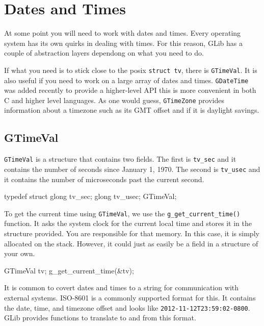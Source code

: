 \chapter{Dates and Times}

At some point you will need to work with dates and times.
Every operating system has its own quirks in dealing with times.
For this reason, GLib has a couple of abstraction layers dependong on what you need to do.

If what you need is to stick close to the posix \verb|struct tv|, there is \verb|GTimeVal|.
It is also useful if you need to work on a large array of dates and times.
\verb|GDateTime| was added recently to provide a higher-level API this is more convenient in both C and higher level languages.
As one would guess, \verb|GTimeZone| provides information about a timezone such as its GMT offset and if it is daylight savings.

\section{GTimeVal}

\verb|GTimeVal| is a structure that contains two fields.
The first is \verb|tv_sec| and it contains the number of seconds since January 1, 1970.
The second is \verb|tv_usec| and it contains the number of microseconds past the current second.

\begin{code}{}
typedef struct
{
    glong tv_sec;
    glong tv_usec;
} GTimeVal;
\end{code}

To get the current time using \verb|GTimeVal|, we use the \verb|g_get_current_time()| function.
It asks the system clock for the current local time and stores it in the structure provided.
You are responsible for that memory.
In this case, it is simply allocated on the stack.
However, it could just as easily be a field in a structure of your own.

\begin{code}{}
GTimeVal tv;
g_get_current_time(&tv);
\end{code}

It is common to covert dates and times to a string for communication with external systems.
ISO-8601 is a commonly supported format for this.
It contains the date, time, and timezone offset and looks like \verb|2012-11-12T23:59:02-0800|.
GLib provides functions to translate to and from this format.

